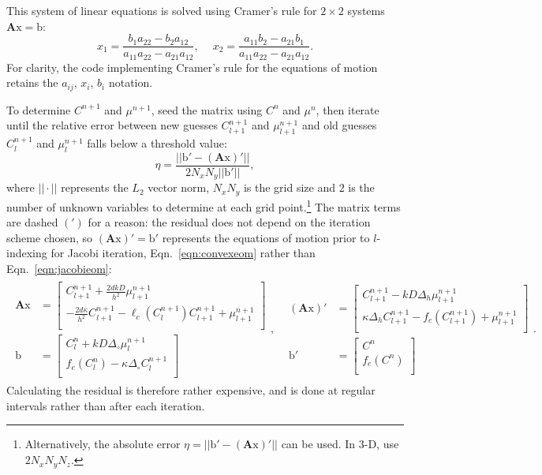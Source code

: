 	This system of linear equations is solved using Cramer's rule for $2\times 2$ systems $\mathbf{A}\mathrm{x}=\mathrm{b}$:
	\[
		x_1 = \frac{b_1a_{22} - b_2a_{12}}{a_{11}a_{22} - a_{21}a_{12}}, \
		\hspace{1em}x_2 = \frac{a_{11}b_2 - a_{21}b_1}{a_{11}a_{22} - a_{21}a_{12}}.
	\]
	For clarity, the code implementing Cramer's rule for the equations of motion retains the $a_{ij}$, $x_i$, $b_i$ notation.		

	To determine $C^{n+1}$ and $\mu^{n+1}$, seed the matrix using $C^n$ and $\mu^n$, then iterate until the relative error
	between new guesses	$C_{l+1}^{n+1}$ and $\mu_{l+1}^{n+1}$ and old guesses $C_l^{n+1}$ and $\mu_l^{n+1}$ falls below a
	threshold value:
	\[\eta = \frac{||\mathrm{b}' - \left(\mathbf{A}\mathrm{x}\right)'||}{2N_xN_y||\mathrm{b}'||},\]
	where $||\cdot||$ represents the $L_2$ vector norm, $N_xN_y$ is the grid size and $2$ is the number of unknown variables to determine at each grid point.\footnote{
	Alternatively, the absolute error $\eta = ||\mathrm{b}' - \left(\mathbf{A}\mathrm{x}\right)'||$ can be used. In 3-D, use $2N_xN_yN_z$.}
	The matrix terms are dashed $(')$ for a reason: the residual does not depend on the iteration scheme chosen, so $\left(\mathbf{A}\mathrm{x}\right)'=\mathrm{b}'$ 
	represents the equations of motion prior to $l$-indexing for Jacobi iteration, Eqn.~\ref{eqn:convexeom} rather than Eqn.~\ref{eqn:jacobieom}:
	\begin{align*}
		\begin{split}
			\mathbf{A}\mathrm{x} &=
			\begin{bmatrix}
				C_{l+1}^{n+1} + \frac{2dkD}{h^2}\mu_{l+1}^{n+1}\\[0.5em]
				-\frac{2d\kappa}{h^2}C_{l+1}^{n+1} - \ell_c(C_l^{n+1})C_{l+1}^{n+1} + \mu_{l+1}^{n+1}\\
			\end{bmatrix}\\
			\mathrm{b} &=
			\begin{bmatrix}
				C_l^n + kD\Delta_\circ\mu_l^{n+1}\\[0.5em]
				f_e(C_l^n) - \kappa\Delta_\circ C_l^{n+1}\\
			\end{bmatrix}
		\end{split},
		&
		\begin{split}
			\left(\mathbf{A}\mathrm{x}\right)' &=
			\begin{bmatrix}
				C_{l+1}^{n+1} - kD\Delta_h\mu_{l+1}^{n+1}\\[0.5em]
				        \kappa\Delta_hC_{l+1}^{n+1} - f_c(C_{l+1}^{n+1}) + \mu_{l+1}^{n+1}\\
			\end{bmatrix}\\
			\mathrm{b}' &=
			\begin{bmatrix}
				C^n\\[0.5em]
				f_e(C^n)\\
			\end{bmatrix}
		\end{split}.
	\end{align*}
	Calculating the residual is therefore rather expensive, and is done at regular intervals rather than after each iteration.

